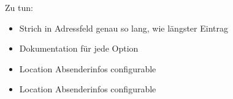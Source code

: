 \documentclass[twoside]{brbrief}
\begin{document}
	\maketitle{}
	
	\lipsum[1-2]
	
	Zu tun:
	\begin{itemize}
		\item Strich in Adressfeld genau so lang, wie längster Eintrag
		\item Dokumentation für jede Option
		\item Location Absenderinfos configurable
		\item Location Absenderinfos configurable
	\end{itemize}
	
	
	
	
	
\end{document}
